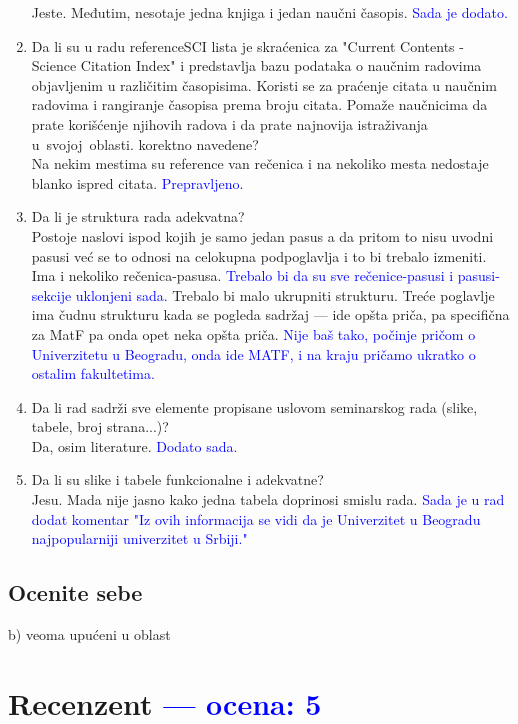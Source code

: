 \documentclass[a4paper]{report}
\newcommand{\odgovor}[1]{\textcolor{blue}{#1}}
\begin{document}
\begin{enumerate}
Jeste. Međutim, nesotaje jedna knjiga i jedan naučni časopis. 
\odgovor{Sada je dodato.}
\item Da li su u radu referenceSCI lista je skraćenica za "Current Contents - Science Citation Index" i predstavlja bazu podataka o naučnim radovima objavljenim u različitim časopisima. Koristi se za praćenje citata u naučnim radovima i rangiranje časopisa prema broju citata. Pomaže naučnicima da prate korišćenje njihovih radova i da prate najnovija istraživanja u svojoj oblasti. korektno navedene?\\
Na nekim mestima su reference van rečenica i na nekoliko mesta nedostaje blanko ispred citata.
\odgovor{Prepravljeno.}
\item Da li je struktura rada adekvatna?\\
Postoje naslovi ispod kojih je samo jedan pasus a da pritom to nisu uvodni pasusi već se to odnosi na celokupna podpoglavlja i to bi trebalo izmeniti. Ima i nekoliko rečenica-pasusa. \odgovor{Trebalo bi da su sve rečenice-pasusi i pasusi-sekcije uklonjeni sada. } Trebalo bi malo ukrupniti strukturu. Treće poglavlje ima čudnu strukturu kada se pogleda sadržaj --- ide opšta priča, pa specifična za MatF pa onda opet neka opšta priča. \odgovor{Nije baš tako, počinje pričom o Univerzitetu u Beogradu, onda ide MATF, i na kraju pričamo ukratko o ostalim fakultetima.}
\item Da li rad sadrži sve elemente propisane uslovom seminarskog rada (slike, tabele, broj strana...)?\\
Da, osim literature. \odgovor{Dodato sada.}
\item Da li su slike i tabele funkcionalne i adekvatne?\\
Jesu. Mada nije jasno kako jedna tabela doprinosi smislu rada. \odgovor{Sada je u rad dodat komentar "{}Iz ovih informacija se vidi da je Univerzitet u Beogradu najpopularniji univerzitet u Srbiji."{}}
\end{enumerate}

\section{Ocenite sebe}
 b) veoma upućeni u oblast


\chapter{Recenzent \odgovor{--- ocena: 5} }
\end{document}

